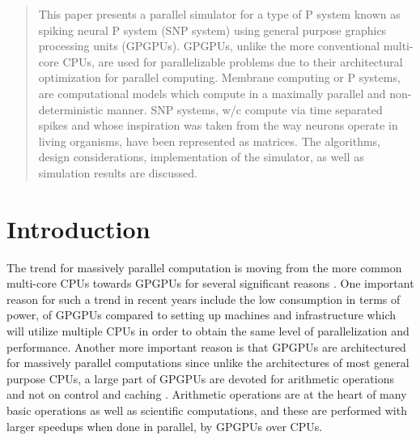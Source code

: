 \documentclass{acm_proc_article-sp}
\begin{document}
\maketitle
\begin{abstract}

This paper presents a parallel simulator for a type of P system known as spiking neural P system (SNP system) using general purpose graphics processing units (GPGPUs). GPGPUs, unlike the more conventional multi-core CPUs, are used for parallelizable problems due to their architectural optimization for parallel computing. Membrane computing or P systems, are computational models which compute in a maximally parallel and non-deterministic manner. SNP systems, w/c compute via time separated spikes and whose inspiration was taken from the way neurons operate in living organisms, have been represented as matrices. The algorithms, design considerations, implementation of the simulator,  as well as simulation results are discussed.

\end{abstract}




\section{Introduction}

The trend for massively parallel computation is moving from the more common multi-core CPUs towards GPGPUs for several significant reasons \cite{cudabook}\cite{cudaguide}. One important reason for such a trend in recent years include the low consumption in terms of power, of GPGPUs compared to setting up machines and infrastructure which will utilize multiple CPUs in order to obtain the same level of parallelization and performance\cite{cudapage}. Another more important reason is that GPGPUs are architectured for massively parallel computations since unlike the architectures of most general purpose CPUs, a large part of GPGPUs are devoted for arithmetic operations and not on control and caching \cite{cudabook}\cite{cudaguide}. Arithmetic operations are at the heart of many basic operations as well as scientific computations, and these are performed with  larger speedups when done in parallel, by GPGPUs over CPUs. 
\end{document}
